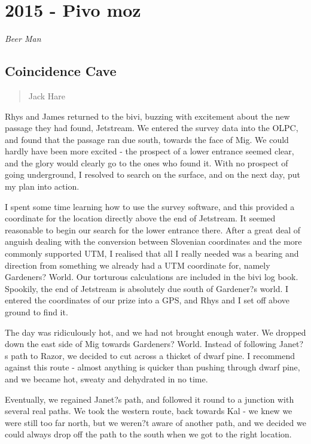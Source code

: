\documentclass[onecolumn]{book}
\begin{document}
\chapter{2015 - Pivo moz} 
\begin{flushright}
\huge \it Beer Man
\end{flushright}

\section{Coincidence Cave}
 \begin{verse}
Jack Hare
\end{verse}

Rhys and James returned to the bivi, buzzing with excitement about the new passage they had found, Jetstream. We entered the survey data into the OLPC, and found that the passage ran due south, towards the face of Mig. We could hardly have been more excited - the prospect of a lower entrance seemed clear, and the glory would clearly go to the ones who found it. With no prospect of going underground, I resolved to search on the surface, and on the next day, put my plan into action.

I spent some time learning how to use the survey software, and this provided a coordinate for the location directly above the end of Jetstream. It seemed reasonable to begin our search for the lower entrance there. After a great deal of anguish dealing with the conversion between Slovenian coordinates and the more commonly supported UTM, I realised that all I really needed was a bearing and direction from something we already had a UTM coordinate for, namely Gardeners? World. Our torturous calculations are included in the bivi log book. Spookily, the end of Jetstream is absolutely due south of Gardener?s world. I entered the coordinates of our prize into a GPS, and Rhys and I set off above ground to find it.

The day was ridiculously hot, and we had not brought enough water. We dropped down the east side of Mig towards Gardeners? World. Instead of following Janet?s path to Razor, we decided to cut across a thicket of dwarf pine. I recommend against this route - almost anything is quicker than pushing through dwarf pine, and we became hot, sweaty and dehydrated in no time.

Eventually, we regained Janet?s path, and followed it round to a junction with several real paths. We took the western route, back towards Kal - we knew we were still too far north, but we weren?t aware of another path, and we decided we could always drop off the path to the south when we got to the right location.
\end{document}

